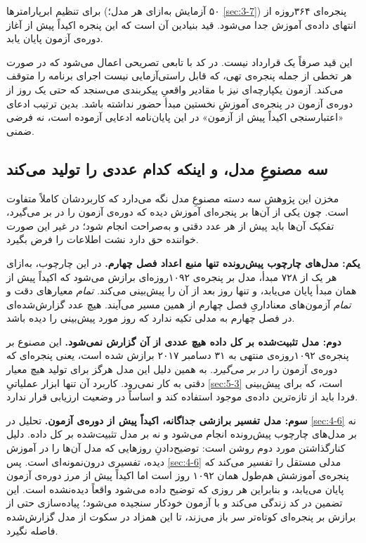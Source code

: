 برای تنظیم ابرپارامترها (۵۰ آزمایش  به‌ازای هر مدل؛ \cref{sec:3-7}) پنجره‌ای
۳۶۴روزه از انتهای داده‌ی آموزش جدا می‌شود. قید بنیادین آن است که این پنجره اکیداً پیش
از آغاز دوره‌ی آزمون پایان یابد.

این قید صرفاً یک قرارداد نیست. در کد با تابعی تصریحی اعمال می‌شود که در صورت هر
تخطی  از جمله پنجره‌ی تهی، که قابل راستی‌آزمایی نیست  اجرای برنامه را
متوقف می‌کند. آزمون یکپارچه‌ای نیز با مقادیر واقعیِ پیکربندی می‌سنجد که حتی یک روز از
دوره‌ی آزمون در پنجره‌ی آموزشِ نخستین مبدأ حضور نداشته باشد. بدین ترتیب ادعای
«اعتبارسنجی اکیداً پیش از آزمون» در این پایان‌نامه ادعایی آزموده است، نه فرضی ضمنی.

\subsection*{سه مصنوعِ مدل، و اینکه کدام عددی را تولید می‌کند}

مخزن این پژوهش سه دسته مصنوعِ مدل نگه می‌دارد که کاربردشان کاملاً متفاوت است. چون یکی
از آن‌ها بر پنجره‌ای آموزش دیده که دوره‌ی آزمون را در بر می‌گیرد، تفکیک آن‌ها باید
پیش از هر عدد دقتی و به‌صراحت انجام شود؛ در غیر این صورت خواننده حق دارد نشت اطلاعات
را فرض بگیرد.

\textbf{یکم: مدل‌های چارچوب پیش‌رونده  تنها منبع اعداد فصل چهارم.} در این
چارچوب، به‌ازای هر یک از ۷۲۸ مبدأ، مدل بر پنجره‌ی ۱۰۹۲روزه‌ای برازش می‌شود که اکیداً
پیش از همان مبدأ پایان می‌یابد، و تنها روز بعد از آن را پیش‌بینی می‌کند. \emph{تمام}
معیارهای دقت و \emph{تمام} آزمون‌های معناداریِ فصل چهارم از همین مسیر می‌آیند. هیچ عدد
گزارش‌شده‌ای در فصل چهارم به مدلی تکیه ندارد که روز مورد پیش‌بینی را دیده باشد.

\textbf{دوم: مدل تثبیت‌شده بر کل داده  هیچ عددی از آن گزارش نمی‌شود.} این مصنوع
بر پنجره‌ی ۱۰۹۲روزه‌ی منتهی به ۳۱ دسامبر ۲۰۱۷ برازش شده است، یعنی پنجره‌ای که دوره‌ی
آزمون را \emph{در بر می‌گیرد}. به همین دلیل این مدل هرگز برای تولید هیچ معیار دقتی به
کار نمی‌رود. کاربرد آن تنها ابزار عملیاتیِ \cref{sec:5-3} است، که برای پیش‌بینی فردا باید از
تازه‌ترین داده‌ی موجود استفاده کند و اساساً در وضعیت ارزیابی قرار ندارد.

\textbf{سوم: مدل تفسیر  برازشی جداگانه، اکیداً پیش از دوره‌ی آزمون.} تحلیل
 در \cref{sec:4-6} نه بر مدل‌های چارچوب پیش‌رونده انجام می‌شود و نه بر مدل تثبیت‌شده
بر کل داده. دلیل کنارگذاشتن مورد دوم روشن است: توضیح‌دادنِ روزهایی که مدل آن‌ها را در
آموزش دیده، تفسیری درون‌نمونه‌ای است. پس \cref{sec:4-6} مدلی مستقل را تفسیر می‌کند که پنجره‌ی
آموزشش هم‌طول همان ۱۰۹۲ روز است اما اکیداً پیش از مرز دوره‌ی آزمون پایان می‌یابد، و
بنابراین هر روزی که توضیح داده می‌شود واقعاً دیده‌نشده است. این تضمین در کد زندگی
می‌کند و با آزمون خودکار سنجیده می‌شود؛ پیاده‌سازی حتی از برازش بر پنجره‌ای کوتاه‌تر
سر باز می‌زند، تا این همزاد در سکوت از مدل گزارش‌شده فاصله نگیرد.

